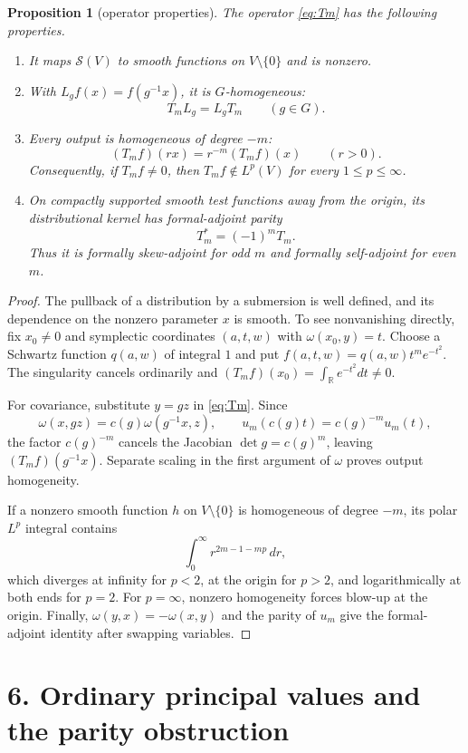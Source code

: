 \documentclass[11pt]{article}
\newtheorem{proposition}[theorem]{Proposition}
\newcommand{\R}{\mathbb R}
\begin{document}
\begin{proposition}[operator properties]\label{prop:operator}
The operator \eqref{eq:Tm} has the following properties.
\begin{enumerate}
\item It maps $\mathcal S(V)$ to smooth functions on $V\setminus\{0\}$ and is nonzero.
\item With $L_gf(x)=f(g^{-1}x)$, it is $G$-homogeneous:
\[
 T_mL_g=L_gT_m\qquad(g\in G).
\]
\item Every output is homogeneous of degree $-m$:
\[
 (T_mf)(rx)=r^{-m}(T_mf)(x)\qquad(r>0).
\]
Consequently, if $T_mf\ne0$, then $T_mf\notin L^p(V)$ for every $1\le p\le\infty$.
\item On compactly supported smooth test functions away from the origin, its distributional kernel has formal-adjoint parity
\[
 T_m^*=(-1)^mT_m.
\]
Thus it is formally skew-adjoint for odd $m$ and formally self-adjoint for even $m$.
\end{enumerate}
\end{proposition}

\begin{proof}
The pullback of a distribution by a submersion is well defined, and its dependence on the nonzero parameter $x$ is smooth.  To see nonvanishing directly, fix $x_0\ne0$ and symplectic coordinates $(a,t,w)$ with $\omega(x_0,y)=t$.  Choose a Schwartz function $q(a,w)$ of integral $1$ and put $f(a,t,w)=q(a,w)t^me^{-t^2}$.  The singularity cancels ordinarily and $(T_mf)(x_0)=\int_{\R}e^{-t^2}dt\ne0$.

For covariance, substitute $y=gz$ in \eqref{eq:Tm}.  Since
\[
 \omega(x,gz)=c(g)\omega(g^{-1}x,z),\qquad
 u_m(c(g)t)=c(g)^{-m}u_m(t),
\]
the factor $c(g)^{-m}$ cancels the Jacobian $\det g=c(g)^m$, leaving $(T_mf)(g^{-1}x)$.  Separate scaling in the first argument of $\omega$ proves output homogeneity.

If a nonzero smooth function $h$ on $V\setminus\{0\}$ is homogeneous of degree $-m$, its polar $L^p$ integral contains
\[
 \int_0^\infty r^{2m-1-mp}\,dr,
\]
which diverges at infinity for $p<2$, at the origin for $p>2$, and logarithmically at both ends for $p=2$.  For $p=\infty$, nonzero homogeneity forces blow-up at the origin.  Finally,
$\omega(y,x)=-\omega(x,y)$ and the parity of $u_m$ give the formal-adjoint identity after swapping variables.
\end{proof}

\section*{6. Ordinary principal values and the parity obstruction}
\end{document}
